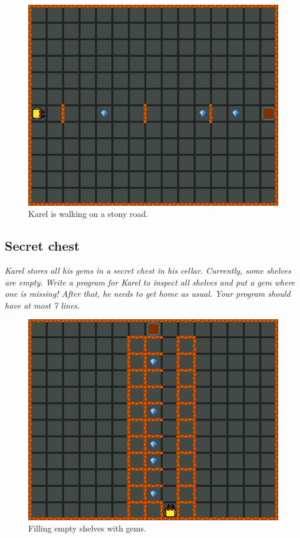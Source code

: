 {{\begin{figure}[!ht]
\begin{center}
\includegraphics[height=0.4\textwidth]{img/d02.png}
\end{center}
\vspace{-4mm}
\caption{Karel is walking on a stony road.}
\label{fig:d02}
\vspace{-10mm}
\end{figure}



\subsection{Secret chest}

{\em Karel stores all his gems in a secret chest in his cellar. 
Currently, some shelves are empty. Write a program for Karel to 
inspect all shelves and put a gem where one is missing! After that, he needs to get 
home as usual. Your program should have at most 7 lines.}

\begin{figure}[!ht]
\begin{center}
\includegraphics[height=0.4\textwidth]{img/d03.png}
\end{center}
\vspace{-4mm}
\caption{Filling empty shelves with gems.}
\label{fig:d03}
\vspace{-4mm}
\end{figure}



}}
